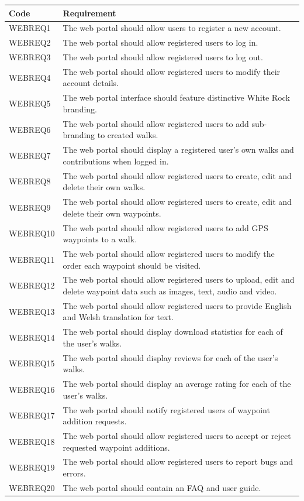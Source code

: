 \documentclass[11pt,a4paper]{article}
\begin{document}
\begin{longtable}{|p{2.5cm}p{13cm}|}
\hline
\textbf{Code} & \textbf{Requirement} \\
\hline
WEBREQ1 & The web portal should allow users to register a new account. \\ \hline
WEBREQ2 & The web portal should allow registered users to log in. \\ \hline
WEBREQ3 & The web portal should allow registered users to log out. \\ \hline
WEBREQ4 & The web portal should allow registered users to modify their account details. \\ \hline
WEBREQ5 & The web portal interface should feature distinctive White Rock branding. \\ \hline
WEBREQ6 & The web portal should allow registered users to add sub-branding to created walks. \\ \hline
WEBREQ7 & The web portal should display a registered user's own walks and contributions when logged in. \\ \hline
WEBREQ8 & The web portal should allow registered users to create, edit and delete their own walks. \\ \hline
WEBREQ9 & The web portal should allow registered users to create, edit and delete their own waypoints. \\ \hline
WEBREQ10 & The web portal should allow registered users to add GPS waypoints to a walk. \\ \hline
WEBREQ11 & The web portal should allow registered users to modify the order each waypoint should be visited. \\ \hline
WEBREQ12 & The web portal should allow registered users to upload, edit and delete waypoint data such as images, text, audio and video. \\ \hline
WEBREQ13 & The web portal should allow registered users to provide English and Welsh translation for text. \\ \hline
WEBREQ14 & The web portal should display download statistics for each of the user's walks. \\ \hline
WEBREQ15 & The web portal should display reviews for each of the user's walks. \\ \hline
WEBREQ16 & The web portal should display an average rating for each of the user's walks. \\ \hline
WEBREQ17 & The web portal should notify registered users of waypoint addition requests. \\ \hline
WEBREQ18 & The web portal should allow registered users to accept or reject requested waypoint additions. \\ \hline
WEBREQ19 & The web portal should allow registered users to report bugs and errors. \\ \hline
WEBREQ20 & The web portal should contain an FAQ and user guide. \\ \hline

\end{longtable}
\end{document}
